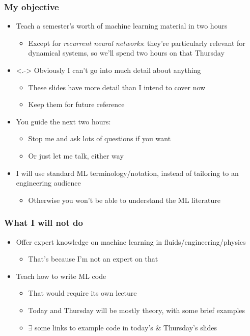 \begin{frame}
    \frametitle{My objective}

    \begin{itemize}
        \item<+-> Teach a semester's worth of machine learning material in two hours
        \begin{itemize}
            \item Except for \emph{recurrent neural networks}: they're particularly relevant for dynamical systems, so we'll spend two hours on that Thursday
        \end{itemize}
        \item<.-> Obviously I can't go into much detail about anything
        \begin{itemize}
            \item These slides have more detail than I intend to cover now
            \item Keep them for future reference
        \end{itemize}
        \item<+-> You guide the next two hours:
        \begin{itemize}
            \item Stop me and ask lots of questions if you want \smiley
            \item Or just let me talk, either way
        \end{itemize}
        \item<+-> I will use standard ML terminology/notation, instead of tailoring to an engineering audience
        \begin{itemize}
            \item Otherwise you won't be able to understand the ML literature
        \end{itemize}
    \end{itemize}
\end{frame}

\begin{frame}
    \frametitle{What I will not do}
    \begin{itemize}
        \item<+-> Offer expert knowledge on machine learning in fluids/engineering/physics
        \begin{itemize}
            \item That's because I'm not an expert on that
        \end{itemize}
        \item<+-> Teach how to write ML code
        \begin{itemize}
            \item That would require its own lecture
            \item Today and Thursday will be mostly theory, with some brief examples
            \item $\exists$ some links to example code in today's \& Thursday's slides
        \end{itemize}
    \end{itemize}
\end{frame}

